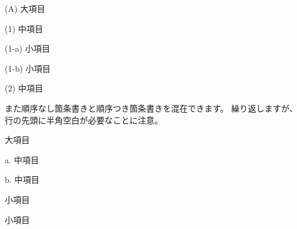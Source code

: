 \begin{starterprogram}\end{starterprogram}
\noindent
{}

\starterresult

\begin{starterenumerate}
\item[(A)] 大項目

\begin{starterenumerate}
\item[(1)] 中項目

\begin{starterenumerate}
\item[(1{-}a)] 小項目
\item[(1{-}b)] 小項目
\end{starterenumerate}

\item[(2)] 中項目
\end{starterenumerate}

\end{starterenumerate}

\endstarterresult

また順序なし箇条書きと順序つき箇条書きを混在できます。
繰り返しますが、行の先頭に半角空白が必要なことに注意。

\begin{starterprogram}\end{starterprogram}
\noindent
{}

\starterresult

\begin{starteritemize}
\item 大項目

\begin{starterenumerate}
\item[a.] 中項目
\item[b.] 中項目

\begin{starteritemize}
\item 小項目
\item 小項目
\end{starteritemize}

\end{starterenumerate}

\end{starteritemize}

